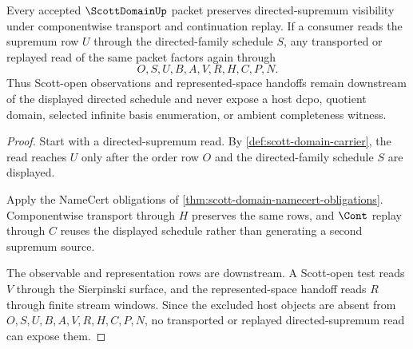 \begin{theorem}\label{thm:scott-domain-directed-supremum-stability}
Every accepted $\ScottDomainUp$ packet preserves directed-supremum visibility under componentwise transport and continuation replay. If a consumer reads the supremum row $U$ through the directed-family schedule $S$, any transported or replayed read of the same packet factors again through
$$
O,S,U,B,A,V,R,H,C,P,N .
$$
Thus Scott-open observations and represented-space handoffs remain downstream of the displayed directed schedule and never expose a host dcpo, quotient domain, selected infinite basis enumeration, or ambient completeness witness.
\end{theorem}
\begin{proof}
Start with a directed-supremum read. By \autoref{def:scott-domain-carrier}, the read reaches $U$ only after the order row $O$ and the directed-family schedule $S$ are displayed.

Apply the NameCert obligations of \autoref{thm:scott-domain-namecert-obligations}. Componentwise transport through $H$ preserves the same rows, and $\Cont$ replay through $C$ reuses the displayed schedule rather than generating a second supremum source.

The observable and representation rows are downstream. A Scott-open test reads $V$ through the Sierpinski surface, and the represented-space handoff reads $R$ through finite stream windows. Since the excluded host objects are absent from $O,S,U,B,A,V,R,H,C,P,N$, no transported or replayed directed-supremum read can expose them.
\end{proof}


\begin{closurestatus}{\ScottDomainUp}
  \theoryclosure{\seedClosure}
  \formalstatus{\theoremCheckedV}
\end{closurestatus}
